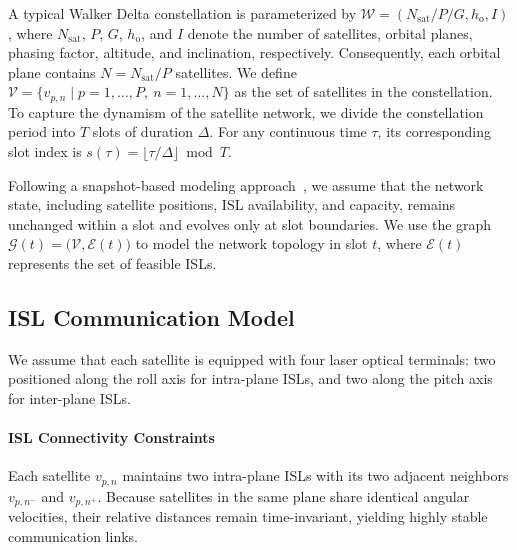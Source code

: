 \documentclass[10pt, conference, letterpaper]{IEEEtran}
\begin{document}
A typical Walker Delta constellation is parameterized by $\mathcal{W}=(N_{\text{sat}}/P/G,h_{\text{o}},I)$, where $N_{\text{sat}}$, $P$, $G$, $h_{\text{o}}$, and $I$ denote the number of satellites, orbital planes, phasing factor, altitude, and inclination, respectively. 
Consequently, each orbital plane contains $N=N_{\text{sat}}/P$ satellites. We define $\mathcal{V}=\{v_{p,n}\mid p=1,\ldots,P,\ n=1,\ldots,N\}$ as the set of satellites in the constellation.
To capture the dynamism of the satellite network, we divide the constellation period into $T$ slots of duration $\Delta$. For any continuous time $\tau$, its corresponding slot index is $s(\tau)=\lfloor\tau/\Delta\rfloor\bmod T$. 

Following a snapshot-based modeling approach~\cite{hier_learn_zhu2025}, we assume that the network state, including satellite positions, ISL availability, and capacity, remains unchanged within a slot and evolves only at slot boundaries.
We use the graph $\mathcal{G}(t) = \big(\mathcal{V}, \mathcal{E}(t)\big)$ to model the network topology in slot $t$, where $\mathcal{E}(t)$ represents the set of feasible ISLs.

\subsection{ISL Communication Model}
We assume that each satellite is equipped with four laser optical terminals: two positioned along the roll axis for intra-plane ISLs, and two along the pitch axis for inter-plane ISLs.


\paragraph{ISL Connectivity Constraints}
Each satellite $v_{p,n}$ maintains two intra-plane ISLs with its two adjacent neighbors $v_{p,n^-}$ and $v_{p,n^+}$.
Because satellites in the same plane share identical angular velocities, their relative distances remain time-invariant, yielding highly stable communication links.
\end{document}
